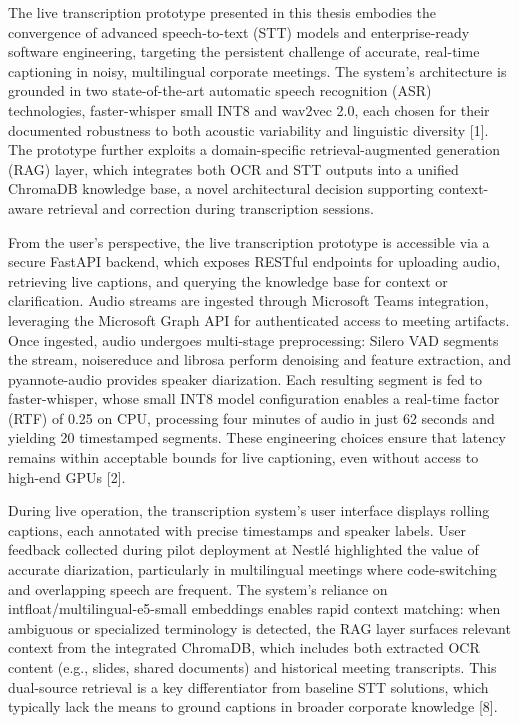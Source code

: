 \documentclass[12pt,a4paper]{article}
\begin{document}
The live transcription prototype presented in this thesis embodies the convergence of advanced speech-to-text (STT) models and enterprise-ready software engineering, targeting the persistent challenge of accurate, real-time captioning in noisy, multilingual corporate meetings. The system’s architecture is grounded in two state-of-the-art automatic speech recognition (ASR) technologies, faster-whisper small INT8 and wav2vec 2.0, each chosen for their documented robustness to both acoustic variability and linguistic diversity [1]. The prototype further exploits a domain-specific retrieval-augmented generation (RAG) layer, which integrates both OCR and STT outputs into a unified ChromaDB knowledge base, a novel architectural decision supporting context-aware retrieval and correction during transcription sessions.


From the user’s perspective, the live transcription prototype is accessible via a secure FastAPI backend, which exposes RESTful endpoints for uploading audio, retrieving live captions, and querying the knowledge base for context or clarification. Audio streams are ingested through Microsoft Teams integration, leveraging the Microsoft Graph API for authenticated access to meeting artifacts. Once ingested, audio undergoes multi-stage preprocessing: Silero VAD segments the stream, noisereduce and librosa perform denoising and feature extraction, and pyannote-audio provides speaker diarization. Each resulting segment is fed to faster-whisper, whose small INT8 model configuration enables a real-time factor (RTF) of 0.25 on CPU, processing four minutes of audio in just 62 seconds and yielding 20 timestamped segments. These engineering choices ensure that latency remains within acceptable bounds for live captioning, even without access to high-end GPUs [2].


During live operation, the transcription system’s user interface displays rolling captions, each annotated with precise timestamps and speaker labels. User feedback collected during pilot deployment at Nestlé highlighted the value of accurate diarization, particularly in multilingual meetings where code-switching and overlapping speech are frequent. The system’s reliance on intfloat/multilingual-e5-small embeddings enables rapid context matching: when ambiguous or specialized terminology is detected, the RAG layer surfaces relevant context from the integrated ChromaDB, which includes both extracted OCR content (e.g., slides, shared documents) and historical meeting transcripts. This dual-source retrieval is a key differentiator from baseline STT solutions, which typically lack the means to ground captions in broader corporate knowledge [8].
\end{document}

